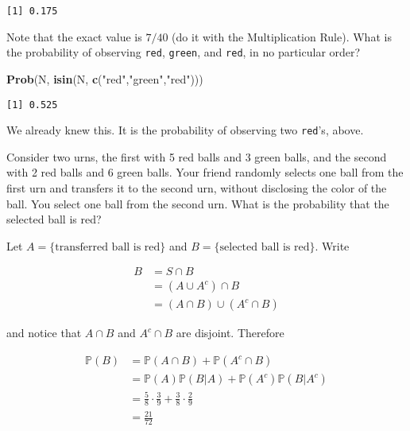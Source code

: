 \documentclass[]{book}
\newenvironment{Shaded}{\begin{snugshade}}{\end{snugshade}}
\newcommand{\KeywordTok}[1]{\textcolor[rgb]{0.13,0.29,0.53}{\textbf{{#1}}}}
\newcommand{\StringTok}[1]{\textcolor[rgb]{0.31,0.60,0.02}{{#1}}}
\newcommand{\NormalTok}[1]{{#1}}
\numberwithin{equation}{chapter}
\numberwithin{figure}{chapter}
\theoremstyle{plain}
\theoremstyle{definition}
\theoremstyle{remark}
\theoremstyle{definition}
\theoremstyle{definition}
\theoremstyle{remark}
\let\BeginKnitrBlock\begin \let\EndKnitrBlock\end
\begin{document}
\begin{verbatim}
[1] 0.175
\end{verbatim}

Note that the exact value is \(7/40\) (do it with the Multiplication
Rule). What is the probability of observing \texttt{red},
\texttt{green}, and \texttt{red}, in no particular order?

\begin{Shaded}
\begin{Highlighting}[]
\KeywordTok{Prob}\NormalTok{(N, }\KeywordTok{isin}\NormalTok{(N, }\KeywordTok{c}\NormalTok{(}\StringTok{"red"}\NormalTok{,}\StringTok{"green"}\NormalTok{,}\StringTok{"red"}\NormalTok{)))}
\end{Highlighting}
\end{Shaded}

\begin{verbatim}
[1] 0.525
\end{verbatim}

We already knew this. It is the probability of observing two
\texttt{red}'s, above.

\bigskip

\BeginKnitrBlock{example}
\protect\hypertarget{ex:unnamed-chunk-166}{}{\label{ex:unnamed-chunk-166}}Consider
two urns, the first with 5 red balls and 3 green balls, and the second
with 2 red balls and 6 green balls. Your friend randomly selects one
ball from the first urn and transfers it to the second urn, without
disclosing the color of the ball. You select one ball from the second
urn. What is the probability that the selected ball is red?
\EndKnitrBlock{example}

Let \(A = \{ \mbox{transferred ball is red} \}\) and
\(B = \{ \mbox{selected ball is red} \}\). Write

\begin{align*}
B & =S\cap B\\
 & =(A\cup A^{c})\cap B\\
 & =(A\cap B)\cup(A^{c}\cap B)
\end{align*}

and notice that \(A\cap B\) and \(A^{c}\cap B\) are disjoint. Therefore

\begin{align*}
\mathbb{P}(B) & =\mathbb{P}(A\cap B)+\mathbb{P}(A^{c}\cap B)\\
 & =\mathbb{P}(A)\mathbb{P}(B|A)+\mathbb{P}(A^{c})\mathbb{P}(B|A^{c})\\
 & =\frac{5}{8}\cdot\frac{3}{9}+\frac{3}{8}\cdot\frac{2}{9}\\
 & =\frac{21}{72}\ 
\end{align*}
\end{document}
